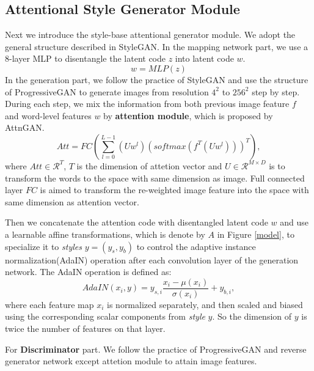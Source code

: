 \documentclass{article}
\begin{document}
\subsection{Attentional Style Generator Module}
Next we introduce the style-base attentional generator module. We adopt the general structure described in StyleGAN\cite{stylegan}. In the mapping network part, we use a 8-layer MLP to disentangle the latent code $z$ into latent code $w$.
\begin{equation}
    w = MLP(z)
\end{equation}
In the generation part, we follow the practice of StyleGAN and use the structure of ProgressiveGAN\cite{progan} to generate images from resolution $4^2$ to $256^2$ step by step. During each step, we mix the information from both previous image feature $f$ and word-level features $w$ by \textbf{attention module}, which is proposed by AttnGAN\cite{attngan}.
\begin{equation}
    Att = FC(\sum_{l=0}^{L-1} (Uw^l)(softmax(f^T (Uw^l)))^T),
\end{equation}
where $Att \in \mathcal{R}^{T}$, $T$ is the dimension of attetion vector and $U \in \mathcal{R}^{M \times D}$ is to transform the words to the space with same dimension as image. Full connected layer $FC$ is aimed to transform the re-weighted image feature into the space with same dimension as attention vector.

Then we concatenate the attention code with disentangled latent code $w$ and use a learnable affine transformations, which is denote by $A$ in Figure \ref{model}, to specialize it to \textit{styles} $y = (y_s, y_b)$ to control the adaptive instance normalization(AdaIN) operation after each convolution layer of the generation network. The AdaIN operation is defined as:
\begin{equation}
    AdaIN(x_i, y) = y_{s,i} \frac{x_i - \mu(x_i)}{\sigma(x_i)} + y_{b,i},
\end{equation}
where each feature map $x_i$ is normalized separately, and then scaled and biased using the corresponding scalar components from \textit{style} $y$. So the dimension of $y$ is twice the number of features on that layer.

For \textbf{Discriminator} part. We follow the practice of ProgressiveGAN\cite{progan} and reverse generator network except attetion module to attain image features.
\end{document}

